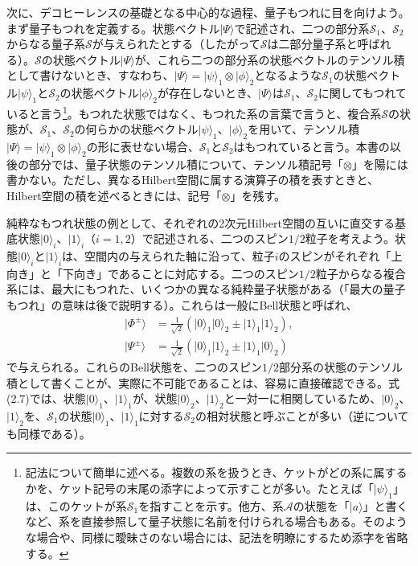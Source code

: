 次に、デコヒーレンスの基礎となる中心的な過程、量子もつれに目を向けよう。まず量子もつれを定義する。状態ベクトル$\lvert\Psi\rangle$で記述され、二つの部分系$\mathcal S_1$、$\mathcal S_2$からなる量子系$\mathcal S$が与えられたとする（したがって$\mathcal S$は二部分量子系と呼ばれる）。$\mathcal S$の状態ベクトル$\lvert\Psi\rangle$が、これら二つの部分系の状態ベクトルのテンソル積として書けないとき、すなわち、$\lvert\Psi\rangle=\lvert\psi\rangle_1\otimes\lvert\phi\rangle_2$となるような$\mathcal S_1$の状態ベクトル$\lvert\psi\rangle_1$と$\mathcal S_2$の状態ベクトル$\lvert\phi\rangle_2$が存在しないとき、$\lvert\Psi\rangle$は$\mathcal S_1$、$\mathcal S_2$に関してもつれていると言う\footnote{記法について簡単に述べる。複数の系を扱うとき、ケットがどの系に属するかを、ケット記号の末尾の添字によって示すことが多い。たとえば「$\lvert\psi\rangle_1$」は、このケットが系$\mathcal S_1$を指すことを示す。他方、系$\mathcal A$の状態を「$\lvert a\rangle$」と書くなど、系を直接参照して量子状態に名前を付けられる場合もある。そのような場合や、同様に曖昧さのない場合には、記法を明瞭にするため添字を省略する。}。もつれた状態ではなく、もつれた系の言葉で言うと、複合系$\mathcal S$の状態が、$\mathcal S_1$、$\mathcal S_2$の何らかの状態ベクトル$\lvert\psi\rangle_1$、$\lvert\phi\rangle_2$を用いて、テンソル積$\lvert\Psi\rangle=\lvert\psi\rangle_1\otimes\lvert\phi\rangle_2$の形に表せない場合、$\mathcal S_1$と$\mathcal S_2$はもつれていると言う。本書の以後の部分では、量子状態のテンソル積について、テンソル積記号「$\otimes$」を陽には書かない。ただし、異なるHilbert空間に属する演算子の積を表すときと、Hilbert空間の積を述べるときには、記号「$\otimes$」を残す。

\hypertarget{srcpage:29}{}\label{srcpage:29}
純粋なもつれ状態の例として、それぞれの2次元Hilbert空間の互いに直交する基底状態$\lvert0\rangle_i$、$\lvert1\rangle_i$（$i=1,2$）で記述される、二つのスピン$1/2$粒子を考えよう。状態$\lvert0\rangle_i$と$\lvert1\rangle_i$は、空間内の与えられた軸に沿って、粒子$i$のスピンがそれぞれ「上向き」と「下向き」であることに対応する。二つのスピン$1/2$粒子からなる複合系には、最大にもつれた、いくつかの異なる純粋量子状態がある（「最大の量子もつれ」の意味は後で説明する）。これらは一般にBell状態と呼ばれ、
\begin{align}
\lvert\Phi^\pm\rangle&=\frac1{\sqrt2}(\lvert0\rangle_1\lvert0\rangle_2\pm\lvert1\rangle_1\lvert1\rangle_2),\tag{2.7a}\\
\lvert\Psi^\pm\rangle&=\frac1{\sqrt2}(\lvert0\rangle_1\lvert1\rangle_2\pm\lvert1\rangle_1\lvert0\rangle_2)\tag{2.7b}
\end{align}
で与えられる。これらのBell状態を、二つのスピン$1/2$部分系の状態のテンソル積として書くことが、実際に不可能であることは、容易に直接確認できる。式(2.7)では、状態$\lvert0\rangle_1$、$\lvert1\rangle_1$が、状態$\lvert0\rangle_2$、$\lvert1\rangle_2$と一対一に相関しているため、$\lvert0\rangle_2$、$\lvert1\rangle_2$を、$\mathcal S_1$の状態$\lvert0\rangle_1$、$\lvert1\rangle_1$に対する$\mathcal S_2$の相対状態と呼ぶことが多い（逆についても同様である）。

